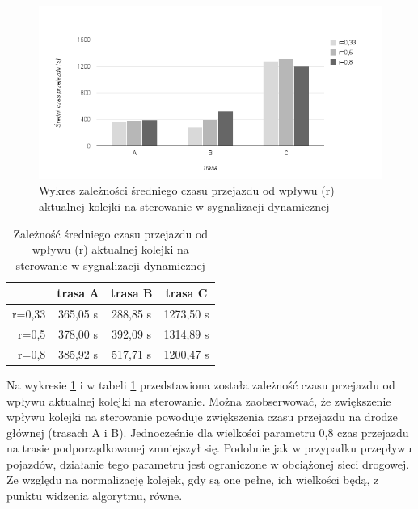 \FloatBarrier
\begin{figure}[h]
    \centering
    \includegraphics[width=1.0\textwidth]{images/wykres_kolejka_czas.png}
    \caption{Wykres zależności średniego czasu przejazdu od wpływu (r) aktualnej kolejki na sterowanie w sygnalizacji dynamicznej}
    \label{fig:wykres_kolejka_czas}
\end{figure}
\FloatBarrier
\begin{table}[h]
	\centering
	\begin{tabular}{ |r|c|c|c| }
		\hline
		& trasa A & trasa B & trasa C \\
		\hline
		r=0,33 & 365,05 s & 288,85 s & 1273,50 s \\
		\hline
		r=0,5 & 378,00 s & 392,09 s & 1314,89 s \\
		\hline
		r=0,8 & 385,92 s & 517,71 s & 1200,47 s \\
		\hline
	\end{tabular}
	\caption{Zależność średniego czasu przejazdu od wpływu (r) aktualnej kolejki na sterowanie w sygnalizacji dynamicznej}
	\label{tab:wykres_kolejka_czas}
\end{table}
\FloatBarrier
Na wykresie \ref{fig:wykres_kolejka_czas} i w tabeli \ref{tab:wykres_kolejka_czas} przedstawiona została zależność czasu przejazdu od wpływu aktualnej kolejki na sterowanie. Można zaobserwować, że zwiększenie wpływu kolejki na sterowanie powoduje zwiększenia czasu przejazdu na drodze głównej (trasach A i B). Jednocześnie dla wielkości parametru 0,8 czas przejazdu na trasie podporządkowanej zmniejszył się.
Podobnie jak w przypadku przepływu pojazdów, działanie tego parametru jest ograniczone w obciążonej sieci drogowej. Ze względu na normalizację kolejek, gdy są one pełne, ich wielkości będą, z punktu widzenia algorytmu, równe.